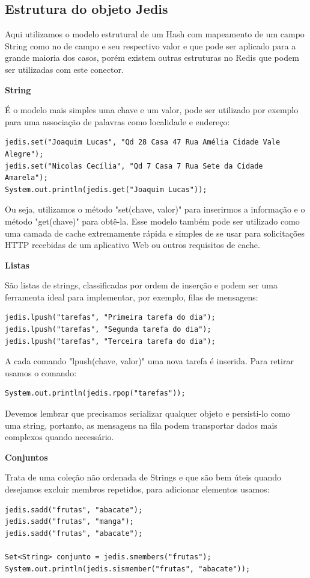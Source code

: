 \subsection{Estrutura do objeto Jedis}
Aqui utilizamos o modelo estrutural de um Hash com mapeamento de um campo String como no de campo e seu respectivo valor e que pode ser aplicado para a grande maioria dos casos, porém existem outras estruturas no Redis que podem ser utilizadas com este conector.

\textbf{String}

É o modelo mais simples uma chave e um valor, pode ser utilizado por exemplo para uma associação de palavras como localidade e endereço:
\begin{lstlisting}[]
jedis.set("Joaquim Lucas", "Qd 28 Casa 47 Rua Amélia Cidade Vale Alegre");
jedis.set("Nicolas Cecília", "Qd 7 Casa 7 Rua Sete da Cidade Amarela");
System.out.println(jedis.get("Joaquim Lucas"));
\end{lstlisting}

Ou seja, utilizamos o método "set(chave, valor)" para inserirmos a informação e o método "get(chave)" para obtê-la. Esse modelo também pode ser utilizado como uma camada de cache extremamente rápida e simples de se usar para solicitações HTTP recebidas de um aplicativo Web ou outros requisitos de cache. 

\textbf{Listas}

São listas de strings, classificadas por ordem de inserção e podem ser uma ferramenta ideal para implementar, por exemplo, filas de mensagens:
\begin{lstlisting}[]
jedis.lpush("tarefas", "Primeira tarefa do dia");
jedis.lpush("tarefas", "Segunda tarefa do dia");
jedis.lpush("tarefas", "Terceira tarefa do dia");
\end{lstlisting}

A cada comando "lpush(chave, valor)" uma nova tarefa é inserida. Para retirar usamos o comando:
\begin{lstlisting}[]
System.out.println(jedis.rpop("tarefas"));
\end{lstlisting}

Devemos lembrar que precisamos serializar qualquer objeto e persisti-lo como uma string, portanto, as mensagens na fila podem transportar dados mais complexos quando necessário.

\textbf{Conjuntos}

Trata de uma coleção não ordenada de Strings e que são bem úteis quando desejamos excluir membros repetidos, para adicionar elementos usamos:
\begin{lstlisting}[]
jedis.sadd("frutas", "abacate");
jedis.sadd("frutas", "manga");
jedis.sadd("frutas", "abacate");

Set<String> conjunto = jedis.smembers("frutas");
System.out.println(jedis.sismember("frutas", "abacate"));
\end{lstlisting}

